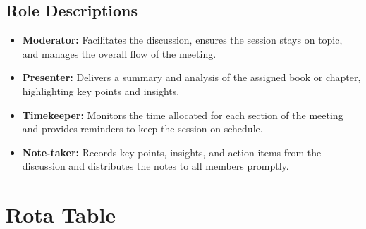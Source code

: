 \documentclass[10pt]{article}
\begin{document}
\subsection*{Role Descriptions}
\begin{itemize}
    \item \textbf{Moderator:} Facilitates the discussion, ensures the session stays on topic, and manages the overall flow of the meeting.
    \item \textbf{Presenter:} Delivers a summary and analysis of the assigned book or chapter, highlighting key points and insights.
    \item \textbf{Timekeeper:} Monitors the time allocated for each section of the meeting and provides reminders to keep the session on schedule.
    \item \textbf{Note-taker:} Records key points, insights, and action items from the discussion and distributes the notes to all members promptly.
\end{itemize}

\section*{Rota Table}

\onehalfspacing

\pagestyle{fancy}
\fancyhf{}
\fancyhead[R]{\thepage}


\newcommand{\authorname}[1]{\textcolor{darkgreen}{#1}}
\newcommand{\reviewername}[1]{\textcolor{purple}{#1}}

\hypersetup{
    colorlinks=true,
    linkcolor=navyblue,
    urlcolor=teal,
}
\end{document}
